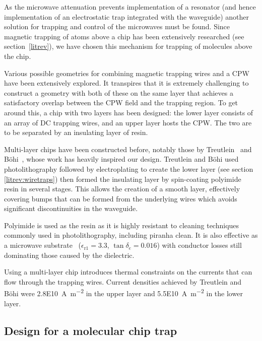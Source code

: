 As the microwave attenuation prevents implementation of a resonator (and hence
implementation of an electrostatic trap integrated with the waveguide) another
solution for trapping and control of the microwaves must be found. Since
magnetic trapping of atoms above a chip has been extensively researched (see
section~\ref{litrev}), we have chosen this mechanism for trapping of molecules
above the chip.

Various possible geometries for combining magnetic trapping wires and a CPW have
been extensively explored. It transpires that it is extremely challenging to
construct a geometry with both of these on the same layer that achieves a
satisfactory overlap between the CPW field and the trapping region. To get
around this, a chip with two layers has been designed: the lower layer consists
of an array of DC trapping wires, and an upper layer hosts the CPW. The two are
to be separated by an insulating layer of resin.

Multi-layer chips have been constructed before, notably those by
Treutlein~\cite{Treutlein2008} and B\"ohi~\cite{rohtua}, whose work has heavily
inspired our design. Treutlein and B\"ohi used photolithography followed by
electroplating to create the lower layer (see section \ref{litrev:wiretraps})
then formed the insulating layer by spin-coating polyimide resin in several
stages. This allows the creation of a smooth layer, effectively covering bumps
that can be formed from the underlying wires which avoids significant
discontinuities in the waveguide.

Polyimide is used as the resin as it is highly resistant to cleaning techniques
commonly used in photolithography, including piranha clean.  It is also
effective as a microwave substrate~\cite{Simons2004} 
($\epsilon_\mathrm{r1} = 3.3$, $\tan\delta_e = 0.016$) with conductor losses
still dominating those caused by the dielectric.

Using a multi-layer chip introduces thermal constraints on the currents that can
flow through the trapping wires. Current densities achieved by Treutlein and
B\"ohi were \SI{2.8E10}{\ampere\per\metre\squared} in the upper layer and
\SI{5.5E10}{\ampere\per\metre\squared} in the lower layer.

\subsection{Design for a molecular chip trap}


